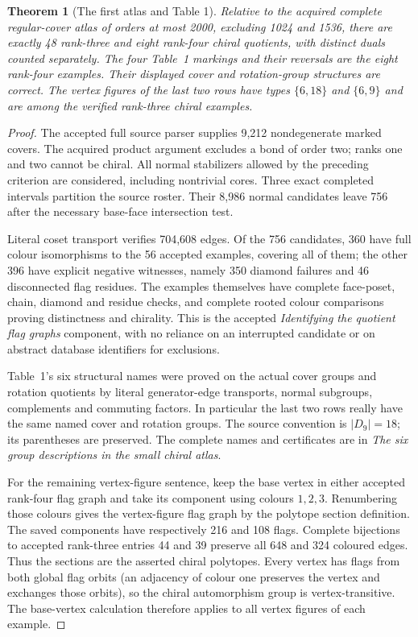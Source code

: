 \documentclass[11pt,a4paper]{article}
\newtheorem{theorem}{Theorem}
\begin{document}
\begin{theorem}[The first atlas and Table 1]
Relative to the acquired complete regular-cover atlas of orders at most
2000, excluding 1024 and 1536, there are exactly 48 rank-three and eight
rank-four chiral quotients, with distinct duals counted separately.
The four Table~1 markings and their reversals are the eight rank-four
examples. Their displayed cover and rotation-group structures are correct.
The vertex figures of the last two rows have types $\{6,18\}$ and $\{6,9\}$
and are among the verified rank-three chiral examples.
\end{theorem}
\begin{proof}
The accepted full source parser supplies 9,212 nondegenerate marked covers.
The acquired product argument excludes a bond of order two; ranks one and
two cannot be chiral. All normal stabilizers allowed by the preceding
criterion are considered, including nontrivial cores. Three exact completed
intervals partition the source roster. Their 8,986 normal candidates leave
756 after the necessary base-face intersection test.

Literal coset transport verifies 704,608 edges. Of the 756 candidates,
360 have full colour isomorphisms to the 56 accepted examples, covering all
of them; the other 396 have explicit negative witnesses, namely 350 diamond
failures and 46 disconnected flag residues. The examples themselves have
complete face-poset, chain, diamond and residue checks, and complete rooted
colour comparisons proving distinctness and chirality. This is the accepted
\emph{Identifying the quotient flag graphs} component, with no reliance on
an interrupted candidate or on abstract database identifiers for exclusions.

Table~1's six structural names were proved on the actual cover groups and
rotation quotients by literal generator-edge transports, normal subgroups,
complements and commuting factors. In particular the last two rows really
have the same named cover and rotation groups. The source convention is
$|D_9|=18$; its parentheses are preserved. The complete names and certificates
are in \emph{The six group descriptions in the small chiral atlas}.

For the remaining vertex-figure sentence, keep the base vertex in either
accepted rank-four flag graph and take its component using colours $1,2,3$.
Renumbering those colours gives the vertex-figure flag graph by the polytope
section definition. The saved components have respectively 216 and 108 flags.
Complete bijections to accepted rank-three entries 44 and 39 preserve all
648 and 324 coloured edges. Thus the sections are the asserted chiral
polytopes. Every vertex has flags from both global flag orbits (an adjacency
of colour one preserves the vertex and exchanges those orbits), so the chiral
automorphism group is vertex-transitive. The base-vertex calculation therefore
applies to all vertex figures of each example.
\end{proof}
\end{document}
